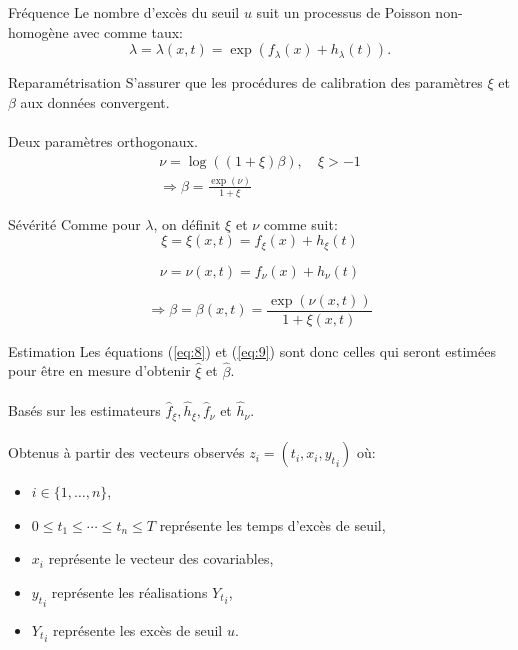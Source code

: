 \documentclass[aspectratio=169, 12pt, french]{beamer}
\begin{document}
\begin{frame}{Fréquence}
Le nombre d'excès du seuil $u$ suit un processus de Poisson non-homogène avec comme taux:
 \begin{equation}
 \lambda = \lambda(x, t) = \exp(f_\lambda(x) + h_\lambda(t)).
  \end{equation}
  
\end{frame}

\begin{frame}{Reparamétrisation}
S'assurer que les procédures de calibration des paramètres $\xi$ et $\beta$ aux données convergent. \\~\\  \pause
Deux paramètres orthogonaux.
\begin{equation*}
 \begin{split}
  \nu = \log((1+\xi)\beta), & \ \xi > -1 \\ 
  \Rightarrow \beta = \frac{\exp(\nu)}{1+\xi}
  \end{split}
  \end{equation*}
\end{frame}

\begin{frame}{Sévérité}
Comme pour $\lambda$, on définit $\xi$ et $\nu$ comme suit:
\begin{equation}\label{eq:8}
 \xi = \xi(x, t) = f_\xi(x) + h_\xi(t)
\end{equation}
  
 \begin{equation}\label{eq:9}
 \nu = \nu(x, t) = f_\nu(x) + h_\nu(t)
 \end{equation}
 
  \begin{equation*}
  \Rightarrow \beta = \beta(x, t) =  \frac{\exp(\nu(x,t))}{1+\xi(x,t)}
 \end{equation*}
\end{frame}

\begin{frame}{Estimation}
Les équations (\ref{eq:8}) et (\ref{eq:9}) sont donc celles qui seront estimées pour être en mesure d'obtenir $\hat\xi$ et $\hat\beta$. \\~\\  \pause
Basés sur les estimateurs $\hat{f}_\xi, \hat{h}_\xi, \hat{f}_\nu$ et $ \hat{h}_\nu$.\\~\\  \pause
Obtenus à partir des vecteurs observés $z_i = (t_i, x_i, {y_t}_{i})$ où:
\begin{itemize}
\item $i \in \{1, \dots, n\}$, \pause
\item $0 \leq t_1 \le \cdots \le t_n \leq T$ représente les temps d'excès de seuil, \pause
\item $x_i$ représente le vecteur des covariables, \pause
\item ${y_t}_{i}$ représente les réalisations ${Y_t}_{i}$, \pause
\item ${Y_t}_{i}$ représente les excès de seuil $u$.
\end{itemize}
\end{frame}
\end{document}
